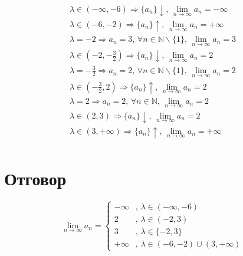 \documentclass{article}
\begin{document}
\begin{gather*}
    \lambda \in (-\infty, -6) \Longrightarrow \{a_n\}\downarrow ,\, \lim_{n \to \infty} a_n = -\infty \\
    \lambda \in (-6, -2) \Longrightarrow \{a_n\}\uparrow ,\, \lim_{n \to \infty} a_n = +\infty \\
    \lambda = -2 \Longrightarrow a_n = 3,\, \forall n \in \mathbb{N}\backslash\{1\},\, \lim_{n \to \infty} a_n = 3 \\
    \lambda \in \left(-2, -\frac{3}{2}\right) \Longrightarrow \{a_n\}\downarrow ,\, \lim_{n \to \infty} a_n = 2 \\
    \lambda = -\frac{3}{2} \Longrightarrow a_n = 2,\, \forall n \in \mathbb{N}\backslash\{1\},\, \lim_{n \to \infty} a_n = 2 \\
    \lambda \in \left(-\frac{3}{2}, 2\right) \Longrightarrow \{a_n\}\uparrow ,\, \lim_{n \to \infty} a_n = 2 \\
    \lambda = 2 \Longrightarrow a_n = 2,\, \forall n \in \mathbb{N},\, \lim_{n \to \infty} a_n = 2 \\
    \lambda \in (2, 3) \Longrightarrow \{a_n\}\downarrow ,\, \lim_{n \to \infty} a_n = 2 \\
    \lambda \in (3, +\infty) \Longrightarrow \{a_n\}\uparrow ,\, \lim_{n \to \infty} a_n = +\infty \\
\end{gather*}

\section{Отговор}

\begin{equation}
    \lim_{n \to \infty} a_n =
    \begin{cases}
        -\infty &,\, \lambda \in (-\infty, -6) \\
        2       &,\, \lambda \in (-2, 3) \\
        3       &,\, \lambda \in \{-2, 3\} \\
        +\infty &,\, \lambda \in (-6, -2) \cup (3, +\infty)
    \end{cases}
\end{equation}
\end{document}
